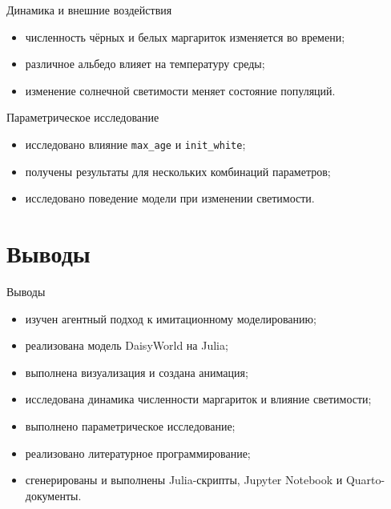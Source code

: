 \documentclass[
  ignorenonframetext,
  aspectratio=169,
  russian,
]{beamer}
\providecommand{\tightlist}{%
  \setlength{\itemsep}{0pt}\setlength{\parskip}{0pt}}
\begin{document}
\begin{frame}{Динамика и внешние воздействия}
\protect{}\label{ux434ux438ux43dux430ux43cux438ux43aux430-ux438-ux432ux43dux435ux448ux43dux438ux435-ux432ux43eux437ux434ux435ux439ux441ux442ux432ux438ux44f}
\begin{itemize}[<+->]
\tightlist
\item
  численность чёрных и белых маргариток изменяется во времени;
\item
  различное альбедо влияет на температуру среды;
\item
  изменение солнечной светимости меняет состояние популяций.
\end{itemize}
\end{frame}

\begin{frame}[fragile]{Параметрическое исследование}
\protect{}\label{ux43fux430ux440ux430ux43cux435ux442ux440ux438ux447ux435ux441ux43aux43eux435-ux438ux441ux441ux43bux435ux434ux43eux432ux430ux43dux438ux435-1}
\begin{itemize}[<+->]
\tightlist
\item
  исследовано влияние \texttt{max\_age} и \texttt{init\_white};
\item
  получены результаты для нескольких комбинаций параметров;
\item
  исследовано поведение модели при изменении светимости.
\end{itemize}
\end{frame}

\section{Выводы}\label{ux432ux44bux432ux43eux434ux44b}

\begin{frame}{Выводы}
\begin{itemize}[<+->]
\tightlist
\item
  изучен агентный подход к имитационному моделированию;
\item
  реализована модель DaisyWorld на Julia;
\item
  выполнена визуализация и создана анимация;
\item
  исследована динамика численности маргариток и влияние светимости;
\item
  выполнено параметрическое исследование;
\item
  реализовано литературное программирование;
\item
  сгенерированы и выполнены Julia-скрипты, Jupyter Notebook и
  Quarto-документы.
\end{itemize}
\end{frame}
\end{document}

